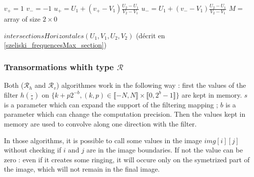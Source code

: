  \begin{algorithme}
   $v_+ = 1$\;
   $v_- = -1$\;
   $u_+ = U_1+(v_+-V_1)\frac{U_2-U_1}{V_2-V_1}$\;
   $u_- = U_1+(v_--V_1)\frac{U_2-U_1}{V_2-V_1}$\;
   $M =$ array of size $2 \times 0$\;
   \caption{$intersectionsHorizontales(U_1,V_1,U_2,V_2)$ (décrit en \ref{szeliski_frequencesMax_section})}
   \label{szeliski_intersectionsHorizontales}
  \end{algorithme}
  
  \subsubsection{Transormations whith type $\mathcal R$}
  
	Both ($\mathcal{R}_h$ and $\mathcal{R}_v$) algorithmes work in the following way : first the values of the filter $h(\frac{\dot{}}{s})$ on $\{k+p2^{-b},(k,p)\in \llbracket -N,N \rrbracket \times \llbracket 0,2^b-1 \rrbracket\}$ are kept in memory. $s$ is a parameter which can expand the support of the filtering mapping ; $b$ is a parameter which can change the computation precision. Then the values kept in memory are used to convolve along one direction with the filter.


  

In those algorithms, it is possible to call some values in the image $img[i][j]$ without checking if $i$ and $j$ are in the image boundaries. If not the value can be zero : even if it creates some ringing, it will occure only on the symetrized part of the image, which will not remain in the final image.

  
